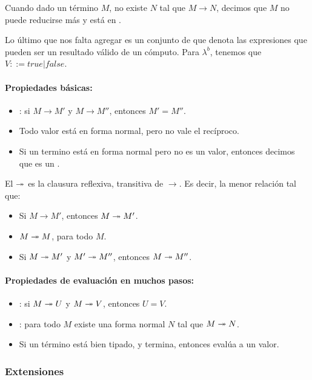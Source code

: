 Cuando dado un término $M$, no existe $N$ tal que $M\to N$, decimos que $M$ no puede reducirse más y está en .

Lo último que nos falta agregar es un conjunto de  que denota las expresiones que pueden ser un resultado válido de un cómputo. Para $\lambda^b$, tenemos que $V ::= true \vert false$.

\paragraph{Propiedades básicas:}

\begin{itemize}
  \item {}: si $M \to M'$ y $M \to M''$, entonces $M'= M''$.
  \item Todo valor está en forma normal, pero no vale el recíproco.
  \item Si un termino está en forma normal pero no es un valor, entonces decimos que es un .
\end{itemize}

\noindent
El  $\twoheadrightarrow$ es la clausura reflexiva, transitiva de $\to$. Es decir, la menor relación tal que:

\begin{itemize}
  \item Si $M\to M'$, entonces $M\twoheadrightarrow M'$.
  \item $M\twoheadrightarrow M$, para todo $M$.
  \item Si $M \twoheadrightarrow M'$ y $M' \twoheadrightarrow M''$, entonces $M \twoheadrightarrow M''$.
\end{itemize}

\paragraph{Propiedades de evaluación en muchos pasos:}

\begin{itemize}
  \item {}: si $M \twoheadrightarrow U$ y $M \twoheadrightarrow V$, entonces $U=V$.
  \item {}: para todo $M$ existe una forma normal $N$ tal que $M \twoheadrightarrow N$.
  \item Si un término está bien tipado, y termina, entonces evalúa a un valor.
\end{itemize}

\subsubsection{Extensiones}

